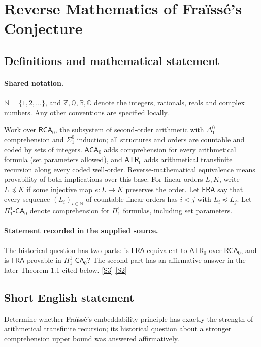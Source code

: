 \documentclass[11pt]{article}
\newcommand{\sref}[2]{\hyperlink{source:#1:#2}{[S#2]}}
\begin{document}
\section{Reverse Mathematics of Fraïssé's Conjecture}\label{statement}

\subsection{Definitions and mathematical statement}

\paragraph{Shared notation.}$\mathbb N=\{1,2,\ldots\}$, and $\mathbb Z,\mathbb Q,\mathbb R,\mathbb C$ denote the integers, rationals, reals and complex numbers. Any other conventions are specified locally.


Work over $\mathsf{RCA}_0$, the subsystem of second-order arithmetic with $\Delta^0_1$ comprehension and $\Sigma^0_1$ induction; all structures and orders are countable and coded by sets of integers. $\mathsf{ACA}_0$ adds comprehension for every arithmetical formula (set parameters allowed), and $\mathsf{ATR}_0$ adds arithmetical transfinite recursion along every coded well-order. Reverse-mathematical equivalence means provability of both implications over this base. For linear orders $L,K$, write $L\preccurlyeq K$ if some injective map $e:L\to K$ preserves the order. Let $\mathsf{FRA}$ say that every sequence $(L_i)_{i\in\mathbb N}$ of countable linear orders has $i<j$ with $L_i\preccurlyeq L_j$. Let $\Pi^1_1$-$\mathsf{CA}_0$ denote comprehension for $\Pi^1_1$ formulas, including set parameters.
\paragraph{Statement recorded in the supplied source.}
The historical question has two parts: is $\mathsf{FRA}$ equivalent to $\mathsf{ATR}_0$ over $\mathsf{RCA}_0$, and is $\mathsf{FRA}$ provable in $\Pi^1_1$-$\mathsf{CA}_0$? The second part has an affirmative answer in the later Theorem 1.1 cited below. \sref{statement}{3} \sref{statement}{2}
\subsection{Short English statement}
Determine whether Fraïssé's embeddability principle has exactly the strength of arithmetical transfinite recursion; its historical question about a stronger comprehension upper bound was answered affirmatively.
\end{document}
